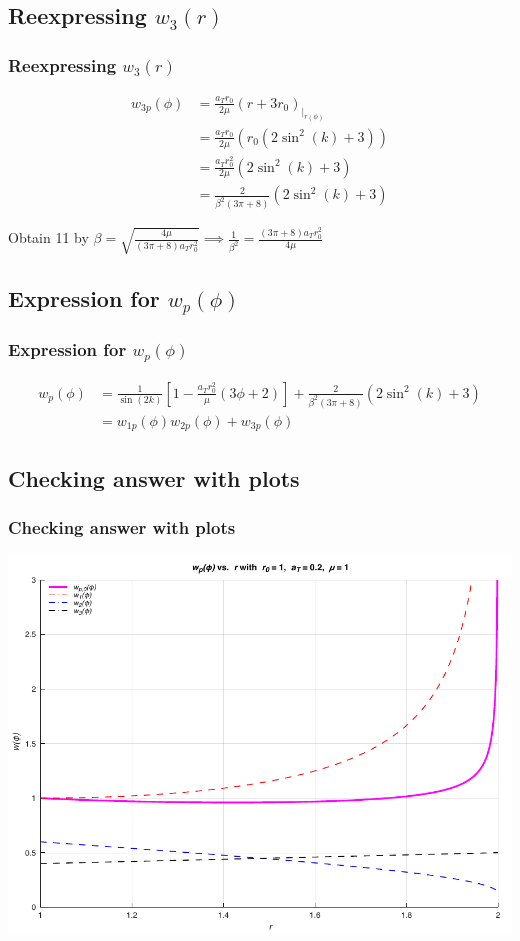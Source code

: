 \documentclass{beamer}
\newcommand{\sectit}[1]{
    \section{\texorpdfstring{#1}{}}
    \frametitle{\texorpdfstring{#1}{}}
}
\begin{document}
\begin{frame}
    \sectit{Reexpressing $w_3(r)$}

    \begin{align}
        w_{3p}(\phi)&=\frac{a_Tr_0}{2\mu}(r+3r_0)_{\big\rvert_{r(\phi)}}\\
        &=\frac{a_Tr_0}{2\mu}(r_0(2\sin^2(k)+3))\\
        &=\frac{a_Tr_0^2}{2\mu}(2\sin^2(k)+3)\\
        &=\frac{2}{\beta^2(3\pi+8)}(2\sin^2(k)+3)
    \end{align}

    Obtain 11 by $\beta=\sqrt{\frac{4\mu}{(3\pi+8)a_Tr_0^2}}\implies \frac{1}{\beta^2}=\frac{(3\pi+8)a_Tr_0^2}{4\mu}$
\end{frame}

\begin{frame}
    \sectit{Expression for $w_p(\phi)$}

    \begin{align}
        w_p(\phi)&=\frac{1}{\sin(2k)}\left[1-\frac{a_Tr_0^2}{\mu}\left(3\phi+2\right)\right]+\frac{2}{\beta^2(3\pi+8)}(2\sin^2(k)+3)\\ %
        &=w_{1p}(\phi)w_{2p}(\phi)+w_{3p}(\phi)
    \end{align}
\end{frame}

\begin{frame}
    \sectit{Checking answer with plots}

    \begin{center}
        \includegraphics[scale=0.7]{../plots/partA_phi.pdf}
    \end{center}
\end{frame}
\end{document}
